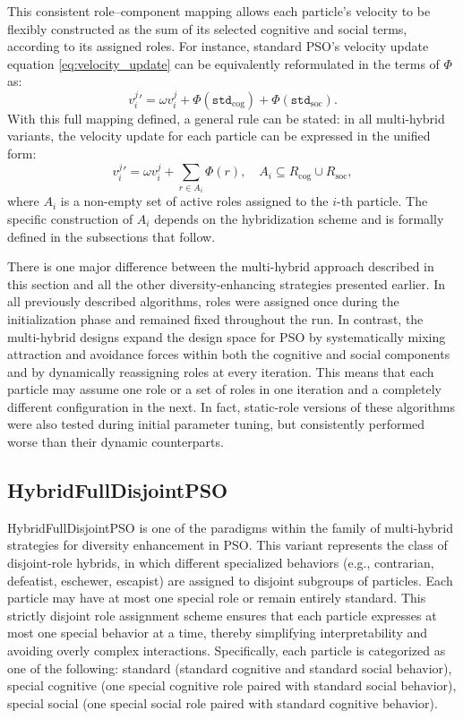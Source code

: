 {This consistent role--component mapping allows each particle’s velocity to be flexibly constructed as the sum of its selected cognitive and social terms, according to its assigned roles. For instance, standard PSO's velocity update equation \eqref{eq:velocity_update} can be equivalently reformulated in the terms of $\Phi$ as:
\begin{equation}\label{eq:velocity_update_reformulated}
    v_{i}^{j}{}' = \omega v_{i}^{j} + \Phi(\texttt{std}_\text{cog}) +  \Phi(\texttt{std}_\text{soc}).
\end{equation}
With this full mapping defined, a general rule can be stated: in all multi-hybrid variants, the velocity update for each particle can be expressed in the unified form:
\begin{equation}\label{eq:velocity_update_universal}
    v_{i}^{j}{}' = \omega v_{i}^{j} + \sum_{r \in A_i} \Phi(r),
\quad 
A_i \subseteq R_\text{cog} \cup R_\text{soc},
\end{equation}
where $A_i$ is a non-empty set of active roles assigned to the $i$-th particle.
The specific construction of $A_i$ depends on the hybridization scheme and is formally defined in the subsections that follow.


There is one major difference between the multi-hybrid approach described in this section and all the other diversity-enhancing strategies presented earlier. In all previously described algorithms, roles were assigned once during the initialization phase and remained fixed throughout the run. In contrast, the multi-hybrid designs expand the design space for PSO by systematically mixing attraction and avoidance forces within both the cognitive and social components and by dynamically reassigning roles at every iteration. This means that each particle may assume one role or a set of roles in one iteration and a completely different configuration in the next. In fact, static-role versions of these algorithms were also tested during initial parameter tuning, but consistently performed worse than their dynamic counterparts.




\subsection{HybridFullDisjointPSO}


HybridFullDisjointPSO is one of the paradigms within the family of multi-hybrid strategies for diversity enhancement in PSO.
This variant represents the class of disjoint-role hybrids, in which different specialized behaviors (e.g., contrarian, defeatist, eschewer, escapist) are assigned to disjoint subgroups of particles. Each particle may have at most one special role or remain entirely standard. This strictly disjoint role assignment scheme ensures that each particle expresses at most one special behavior at a time, thereby simplifying interpretability and avoiding overly complex interactions. Specifically, each particle is categorized as one of the following: standard (standard cognitive and standard social behavior),  special cognitive (one special cognitive role paired with standard social behavior), special social (one special social role paired with standard cognitive behavior).


}
